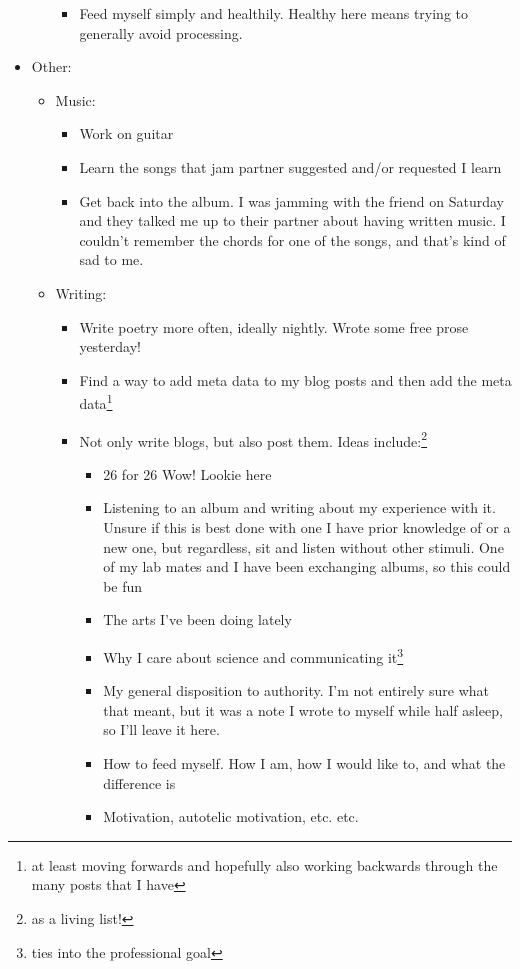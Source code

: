 \documentclass[12pt]{article}[titlepage]
\newcommand{\1}{\={a}}
\newcommand{\2}{\={e}}
\newcommand{\3}{\={\i}}
\newcommand{\4}{\=o}
\newcommand{\5}{\=u}
\newcommand{\6}{\={A}}
\renewcommand{\,}{\textsuperscript{,}}
\begin{document}
\begin{itemize}
\begin{itemize}
\begin{itemize}
\item Feed myself simply and healthily. Healthy here means trying to generally avoid processing.  
\end{itemize}   
\end{itemize}   
\item Other:   
\begin{itemize}   
\item Music:   
\begin{itemize}   
\item Work on guitar  
\item Learn the songs that jam partner suggested and/or requested I learn  
\item Get back into the album. I was jamming with the friend on Saturday and they talked me up to their partner about having written music. I couldn't remember the chords for one of the songs, and that's kind of sad to me.  
\end{itemize}   
\item Writing:  
\begin{itemize}   
\item Write poetry more often, ideally nightly. Wrote some free prose yesterday!  
\item Find a way to add meta data to my blog posts and then add the meta data\footnote{at least moving forwards and hopefully also working backwards through the many posts that I have}  
\item Not only write blogs, but also post them. Ideas include:\footnote{as a living list!}  
\begin{itemize}   
\item 26 for 26 Wow! Lookie here  
\item Listening to an album and writing about my experience with it. Unsure if this is best done with one I have prior knowledge of or a new one, but regardless, sit and listen without other stimuli. One of my lab mates and I have been exchanging albums, so this could be fun  
\item The arts I've been doing lately  
\item Why I care about science and communicating it\footnote{ties into the professional goal}  
\item My general disposition to authority. I'm not entirely sure what that meant, but it was a note I wrote to myself while half asleep, so I'll leave it here.  
\item How to feed myself. How I am, how I would like to, and what the difference is  
\item Motivation, autotelic motivation, etc. etc.  

\end{itemize}
\end{itemize}
\end{itemize}
\end{itemize}
\end{document}

